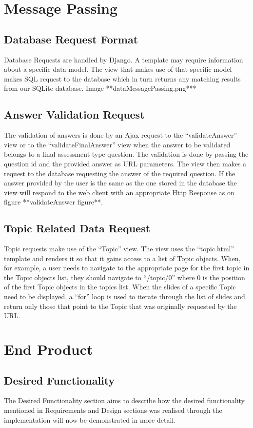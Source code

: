 \documentclass{l3proj}
\begin{document}
{\section{Message Passing}

\subsection{Database Request Format}
Database Requests are handled by Django. A template may require information about a specific data model. The view that makes use of that specific model makes SQL request to the database which in turn returns any matching results from our SQLite database.
Image **dataMessagePassing.png***

\subsection{Answer Validation Request}
The validation of answers is done by an Ajax request to  the “validateAnswer” view or to the “validateFinalAnswer” view when the answer to be validated belongs to a final assessment type question. The validation is done by passing the question id and the provided answer as URL parameters. The view  then makes a request to the database requesting the answer of the required question. If the answer provided by the user is the same as the one stored in the database the view will respond to the web client with an appropriate Http Response as on figure **validateAnswer figure**. 

\subsection{Topic Related Data Request}
Topic requests make use of the “Topic” view. The view uses the “topic.html” template and renders it so that it gains access to a list of Topic objects. When, for example, a user needs to navigate to the appropriate page for the first topic in the Topic objects list, they should navigate to “/topic/0” where 0 is the position of the first Topic objects in the topics list. When the slides of a specific Topic need to be displayed, a “for” loop is used to iterate through the list of slides and return only those that point to the Topic that was originally requested by the URL.

\section{End Product}
\subsection{Desired Functionality}
The Desired Functionality section aims to describe how the desired functionality mentioned in Requirements and Design sections was realised through the implementation will now be demonstrated in more detail.

}
\end{document}

